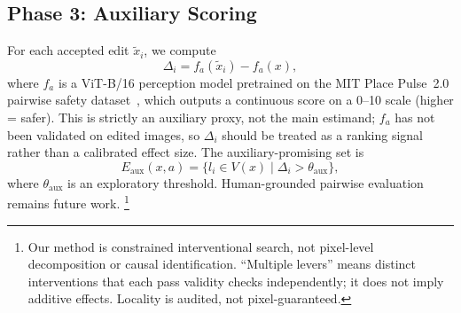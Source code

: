 \subsection{Phase 3: Auxiliary Scoring}

For each accepted edit $\tilde{x}_i$, we compute
\begin{equation}
  \Delta_i = f_a(\tilde{x}_i) - f_a(x),
\end{equation}
where $f_a$ is a ViT-B/16 perception model pretrained on the MIT Place
Pulse~2.0 pairwise safety dataset~\cite{hou2024globalstreetscapes},
which outputs a continuous score on a 0--10 scale (higher = safer).
This is strictly an auxiliary proxy, not the main estimand; $f_a$ has
not been validated on edited images, so $\Delta_i$ should be treated as
a ranking signal rather than a calibrated effect size. The auxiliary-promising set is
\begin{equation}
  E_{\mathrm{aux}}(x,a) = \{ l_i \in V(x) \mid \Delta_i >
  \theta_{\mathrm{aux}} \},
\end{equation}
where $\theta_{\mathrm{aux}}$ is an exploratory threshold.
Human-grounded pairwise evaluation remains future
work.%
\footnote{Our method is constrained interventional search, not
pixel-level decomposition or causal identification. ``Multiple levers''
means distinct interventions that each pass validity checks
independently; it does not imply additive effects. Locality is audited,
not pixel-guaranteed.}
